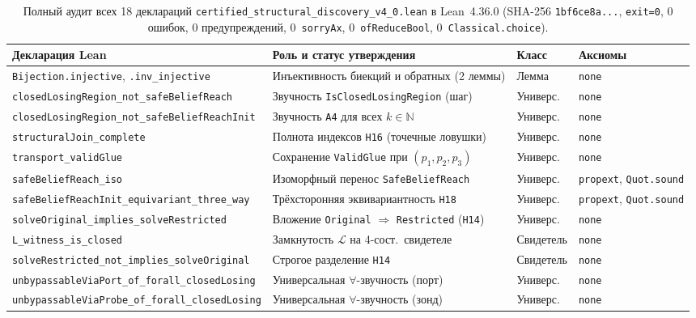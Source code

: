 \documentclass[10pt,a4paper]{article}
\newcommand{\code}[1]{\nolinkurl{#1}}
\begin{document}
\begin{table}[!htbp]
\centering
\caption{Полный аудит всех 18 деклараций \code{certified_structural_discovery_v4_0.lean} в Lean~4.36.0 (SHA-256 \code{1bf6ce8a...}, \code{exit=0}, 0 ошибок, 0 предупреждений, 0~\code{sorryAx}, 0~\code{ofReduceBool}, 0~\code{Classical.choice}).}
\label{tab:lean-audit}
\footnotesize
\renewcommand{\arraystretch}{1.12}
\begin{tabularx}{\linewidth}{@{}>{\raggedright\arraybackslash}p{6.5cm}>{\raggedright\arraybackslash}Xll@{}}
\toprule
\textbf{Декларация Lean} & \textbf{Роль и статус утверждения} & \textbf{Класс} & \textbf{Аксиомы} \\
\midrule
\code{Bijection.injective}, \code{.inv_injective} & Инъективность биекций и обратных (2 леммы) & Лемма & \code{none} \\
\code{closedLosingRegion_not_safeBeliefReach} & Звучность \code{IsClosedLosingRegion} (шаг) & Универс. & \code{none} \\
\code{closedLosingRegion_not_safeBeliefReachInit} & Звучность \code{A4} для всех $k \in \mathbb{N}$ & Универс. & \code{none} \\
\code{structuralJoin_complete} & Полнота индексов \code{H16} (точечные ловушки) & Универс. & \code{none} \\
\code{transport_validGlue} & Сохранение \code{ValidGlue} при $(p_1, p_2, p_3)$ & Универс. & \code{none} \\
\code{safeBeliefReach_iso} & Изоморфный перенос \code{SafeBeliefReach} & Универс. & \texttt{propext}, \texttt{Quot.sound} \\
\code{safeBeliefReachInit_equivariant_three_way} & Трёхсторонняя эквивариантность \code{H18} & Универс. & \texttt{propext}, \texttt{Quot.sound} \\
\code{solveOriginal_implies_solveRestricted} & Вложение \code{Original} $\Rightarrow$ \code{Restricted} (\code{H14}) & Универс. & \code{none} \\
\code{L_witness_is_closed} & Замкнутость $\mathcal{L}$ на 4-сост.\ свидетеле & Свидетель & \code{none} \\
\code{solveRestricted_not_implies_solveOriginal} & Строгое разделение \code{H14} & Свидетель & \code{none} \\
\code{unbypassableViaPort_of_forall_closedLosing} & Универсальная $\forall$-звучность (порт) & Универс. & \code{none} \\
\code{unbypassableViaProbe_of_forall_closedLosing} & Универсальная $\forall$-звучность (зонд) & Универс. & \code{none} \\

\end{tabularx}
\end{table}
\end{document}
